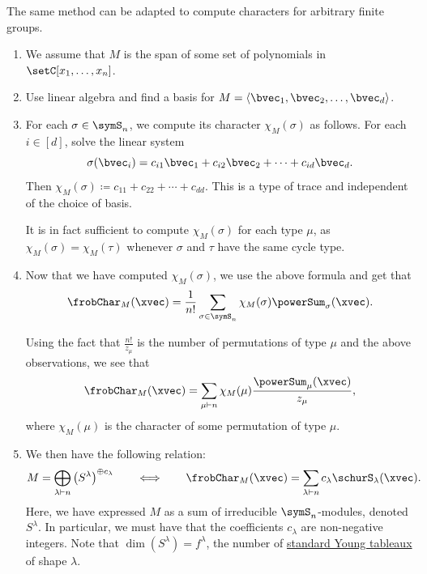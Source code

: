The same method can be adapted to compute characters for arbitrary finite groups.

\begin{enumerate}
\item
We assume that $M$ is the span of some set of polynomials in $\setC[x_1,\dotsc,x_n]$.

\item
Use linear algebra and find a basis for $M = \langle \bvec_1,\bvec_2,\dotsc,\bvec_d \rangle$.

\item
For each $\sigma \in \symS_n$, we compute its character $\chi_M(\sigma)$ as follows.
For each $i \in [d]$, solve the linear system
 \[
 \sigma(\bvec_i) = c_{i1} \bvec_1 + c_{i2} \bvec_2 + \dotsb +  c_{id} \bvec_d.
 \]
 Then $\chi_M(\sigma) \coloneqq c_{11} + c_{22} + \dotsb + c_{dd}$.
 This is a type of trace and independent of the choice of basis.

 It is in fact sufficient to compute $\chi_M(\sigma)$ for each type $\mu$,
 as $\chi_M(\sigma)=\chi_M(\tau)$ whenever $\sigma$ and $\tau$ have the same cycle type.


\item

Now that we have computed $\chi_M(\sigma)$, we use the above formula and get that
\[
\frobChar_M(\xvec) = \frac{1}{n!} \sum_{\sigma \in \symS_n} \chi_M(\sigma) \powerSum_\sigma(\xvec).
\]

Using the fact that $\frac{n!}{z_\mu}$ is the number of permutations of type $\mu$
and the above observations, we see that
\[
\frobChar_M(\xvec) = \sum_{\mu \vdash n} \chi_M(\mu) \frac{\powerSum_\mu(\xvec)}{z_\mu},
\]
where $\chi_M(\mu)$ is the character of some permutation of type $\mu$.

\item

We then have the following relation:
 \[
  M = \bigoplus_{\lambda \vdash n} \left(S^{\lambda} \right)^{\oplus c_\lambda} \qquad
  \Longleftrightarrow
  \qquad
  \frobChar_M(\xvec) = \sum_{\lambda \vdash n} c_\lambda \schurS_\lambda(\xvec).
 \]
 Here, we have expressed $M$ as a sum of irreducible $\symS_n$-modules, denoted $S^{\lambda}$.
 In particular, we must have that the coefficients $c_\lambda$ are non-negative integers.
 Note that $\dim(S^{\lambda}) = f^\lambda$, the number of
 \hyperref[prelimTableaux]{standard Young tableaux} of shape $\lambda$.

\end{enumerate}

